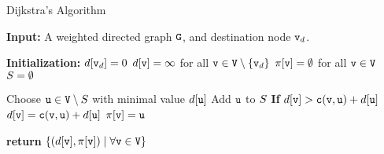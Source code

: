 






\begin{algorithm}[h!]
\caption{Dijkstra's Algorithm}
\label{Alg:Dijkstra}
\begin{algorithmic}[1]
\State \textbf{Input:} A weighted directed graph ${\tt G}$, and destination node ${\tt v}_d$.

\State \textbf{Initialization:} 
\State \quad $d[{\tt v}_d] = 0$
\State \quad $d[{\tt v}] = \infty$ for all ${\tt v} \in {\tt V} \setminus \{{\tt v}_d\}$
\State \quad $\pi[{\tt v}] = \emptyset$ for all ${\tt v} \in {\tt V}$
\State \quad ${S} = \emptyset$

\While{$\vertexset \neq \nodes$}
    \State Choose ${\tt u} \in {\tt V} \setminus {S}$ with minimal value $d[{\tt u}]$
    \State Add ${\tt u}$ to ${S}$
    \ForAll{$(\nodev, \nodeu) \in \edges$}
        \State \textbf{If} {$d[{\tt v}] > {\tt c}({\tt v}, {\tt u}) + d[{\tt u}]$}
            \State \quad $d[{\tt v}] = {\tt c}({\tt v}, {\tt u}) + d[{\tt u}]$
            \State \quad $\pi[{\tt v}] = {\tt u}$
    \EndFor
\EndWhile

\State \textbf{return} $\{(d[{\tt v}], \pi[{\tt v}]) \mid \forall {\tt v} \in {\tt V}\}$
\end{algorithmic}
\end{algorithm}

